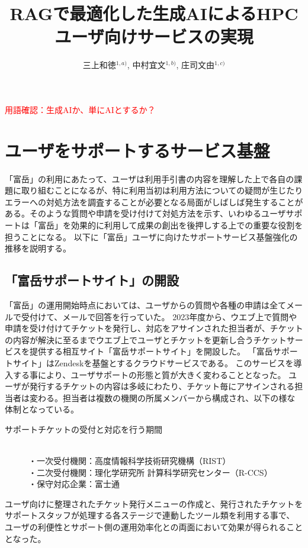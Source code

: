 \documentclass{jsaxiesproc}
\title{
	RAGで最適化した生成AIによるHPCユーザ向けサービスの実現
}
\author{
三上和徳$^{1,a)}$,
中村宜文$^{1,b)}$,
庄司文由$^{1,c)}$
}
\affiliation{
1) 理化学研究所 計算科学研究センター
}
\begin{document}
\maketitle



\textcolor{red}{
用語確認：生成AIか、単にAIとするか？
}




\section{ユーザをサポートするサービス基盤}
「富岳」の利用にあたって、ユーザは利用手引書の内容を理解した上で各自の課題に取り組むことになるが、特に利用当初は利用方法についての疑問が生じたりエラーへの対処方法を調査することが必要となる局面がしばしば発生することがある。そのような質問や申請を受け付けて対処方法を示す、いわゆるユーザサポートは「富岳」を効果的に利用して成果の創出を後押しする上での重要な役割を担うことになる。
以下に「富岳」ユーザに向けたサポートサービス基盤強化の推移を説明する。

\subsection{「富岳サポートサイト」の開設}

「富岳」の運用開始時点においては、ユーザからの質問や各種の申請は全てメールで受付けて、メールで回答を行っていた。
2023年度から、ウエブ上で質問や申請を受け付けてチケットを発行し、対応をアサインされた担当者が、チケットの内容が解決に至るまでウエブ上でユーザとチケットを更新し合うチケットサービスを提供する相互サイト「富岳サポートサイト」を開設した。
「富岳サポートサイト」はZendeskを基盤とするクラウドサービスである。
このサービスを導入する事により、ユーザサポートの形態と質が大きく変わることとなった。
ユーザが発行するチケットの内容は多岐にわたり、チケット毎にアサインされる担当者は変わる。担当者は複数の機関の所属メンバーから構成され、以下の様な体制となっている。

\begin{description}
\item[サポートチケットの受付と対応を行う期間]\mbox{}\\
・一次受付機関：高度情報科学技術研究機構（RIST）\\
・二次受付機関：理化学研究所 計算科学研究センター（R-CCS）\\
・保守対応企業：富士通
\end{description}

ユーザ向けに整理されたチケット発行メニューの作成と、発行されたチケットをサポートスタッフが処理する各ステージで連動したツール類を利用する事で、
ユーザの利便性とサポート側の運用効率化との両面において効果が得られることとなった。
\end{document}
